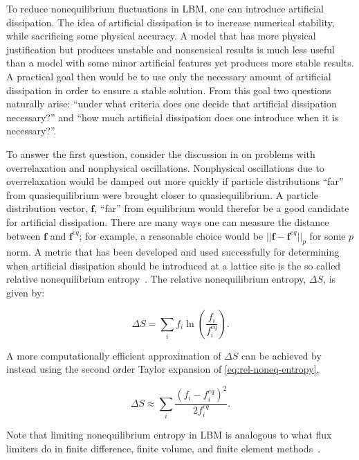\documentclass{article}
\begin{document}
To reduce nonequilibrium fluctuations in LBM, one can introduce artificial dissipation.
The idea of artificial dissipation is to increase numerical stability, while sacrificing some physical accuracy.
A model that has more physical justification but produces unstable and nonsensical results is much less useful than a model with some minor artificial features yet produces more stable results.
A practical goal then would be to use only the necessary amount of artificial dissipation in order to ensure a stable solution.
From this goal two questions naturally arise: ``under what criteria does one decide that artificial dissipation necessary?'' and ``how much artificial dissipation does one introduce when it is necessary?''.

To answer the first question, consider the discussion in  on problems with overrelaxation and nonphysical oscillations.
Nonphysical oscillations due to overrelaxation would be damped out more quickly if particle distributions ``far'' from quasiequilibrium were brought closer to quasiequilibrium.
A particle distribution vector, $\mathbf{f}$, ``far'' from equilibrium would therefor be a good candidate for artificial dissipation.
There are many ways one can measure the distance between $\mathbf{f}$ and $\mathbf{f}^{eq}$; for example, a reasonable choice would be $||\mathbf{f} - \mathbf{f}^{eq}||_p$ for some $p$ norm.
A metric that has been developed and used successfully for determining when artificial dissipation should be introduced at a lattice site is the so called relative nonequilibrium entropy~\cite{gorban2014enhancement,brownlee2006stabilization,brownlee2007stability,brownlee2008nonequilibrium,packwood2009entropy}.
The relative nonequilibrium entropy, $\Delta S$, is given by:

\begin{equation} \label{eq:rel-noneq-entropy}
\Delta S = \sum_i f_i \ln(\frac{f_i}{f^{eq}_i}).
\end{equation}

\noindent A more computationally efficient approximation of $\Delta S$ can be achieved by instead using the second order Taylor expansion of \eqref{eq:rel-noneq-entropy},

\begin{equation} \label{eq:quadratic-entropy}
\Delta S \approx \sum_i \frac{(f_i - f^{eq}_i)^2}{2f^{eq}_i}.
\end{equation}

\noindent Note that limiting nonequilibrium entropy in LBM is analogous to what flux limiters do in finite difference, finite volume, and finite element methods~\cite{brownlee2008nonequilibrium}.
\end{document}
